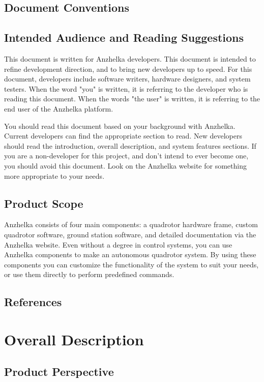 \documentclass[english]{article}
\numberwithin{equation}{section} %
\begin{document}
\subsection{Document Conventions}
\subsection{Intended Audience and Reading Suggestions}
This document is written for Anzhelka developers. This document is intended to refine development direction, and to bring new developers up to speed. For this document, developers include software writers, hardware designers, and system testers. When the word "you" is written, it is referring to the developer who is reading this document. When the words "the user" is written, it is referring to the end user of the Anzhelka platform.

You should read this document based on your background with Anzhelka. Current developers can find the appropriate section to read. New developers should read the introduction, overall description, and system features sections. If you are a non-developer for this project, and don't intend to ever become one, you should avoid this document. Look on the Anzhelka website for something more appropriate to your needs.


\subsection{Product Scope}
Anzhelka consists of four main components: a quadrotor hardware frame, custom quadrotor software, ground station software, and detailed documentation via the Anzhelka website. Even without a degree in control systems, you can use Anzhelka components to make an autonomous quadrotor system. By using these components you can customize the functionality of the system to suit your needs, or use them directly to perform predefined commands.


\subsection{References}

\newpage
\section{Overall Description}
\subsection{Product Perspective}
\end{document}
